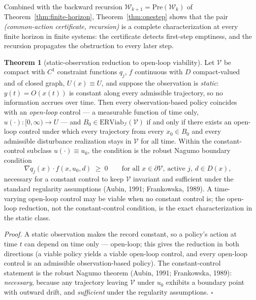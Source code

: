 \documentclass[10pt,twocolumn]{article}
\theoremstyle{definition}
\newtheorem{theorem}{Theorem}
\begin{document}
Combined with the backward recursion \(\mathcal{W}_{k+1} = \mathrm{Pre}(\mathcal{W}_{k})\) of Theorem~\ref{thm:finite-horizon}, Theorem~\ref{thm:onestep} shows that the pair \emph{(common-action certificate, recursion)} is a complete characterization at every finite horizon in finite systems: the certificate detects first-step emptiness, and the recursion propagates the obstruction to every later step.

\begin{theorem}[static-observation reduction to open-loop viability]\label{thm:static-complete}
Let \(\mathcal{V}\) be compact with \(C^{1}\) constraint functions \(q_{j}\), \(f\) continuous with \(D\) compact-valued and of closed graph, \(U(x) \equiv U\), and suppose the observation is \emph{static}: \(y(t) = O(x(t))\) is constant along every admissible trajectory, so no information accrues over time. Then every observation-based policy coincides with an \emph{open-loop} control --- a measurable function of time only, \(u(\cdot):[0,\infty)\to U\) --- and \(B_{0} \in \mathrm{ERViab}_{\mathcal{I}}(\mathcal{V})\) if and only if there exists an open-loop control under which every trajectory from every \(x_{0} \in B_{0}\) and every admissible disturbance realization stays in \(\mathcal{V}\) for all time. Within the constant-control subclass \(u(\cdot) \equiv u_{0}\), the condition is the robust Nagumo boundary condition
\[
\nabla q_{j}(x) \cdot f(x, u_{0}, d) \;\ge\; 0
\qquad \text{for all } x \in \partial\mathcal{V},\ \text{active } j,\ d \in D(x),
\]
necessary for a constant control to keep \(\mathcal{V}\) invariant and sufficient under the standard regularity assumptions (Aubin, 1991; Frankowska, 1989). A time-varying open-loop control may be viable when no constant control is; the open-loop reduction, not the constant-control condition, is the exact characterization in the static class.
\end{theorem}

\emph{Proof.} A static observation makes the record constant, so a policy's action at time \(t\) can depend on time only --- open-loop; this gives the reduction in both directions (a viable policy yields a viable open-loop control, and every open-loop control is an admissible observation-based policy). The constant-control statement is the robust Nagumo theorem (Aubin, 1991; Frankowska, 1989): \emph{necessary}, because any trajectory leaving \(\mathcal{V}\) under \(u_{0}\) exhibits a boundary point with outward drift, and \emph{sufficient} under the regularity assumptions. \hfill\(\square\)
\end{document}
